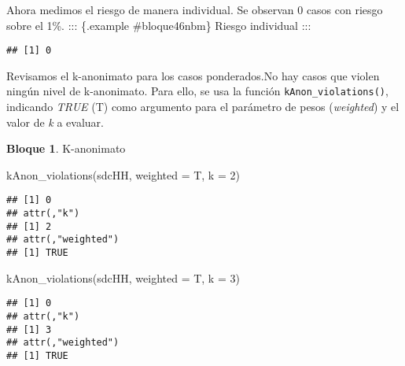 \documentclass[
]{book}
\newenvironment{Shaded}{\begin{snugshade}}{\end{snugshade}}
\newcommand{\AttributeTok}[1]{\textcolor[rgb]{0.77,0.63,0.00}{#1}}
\newcommand{\CommentTok}[1]{\textcolor[rgb]{0.56,0.35,0.01}{\textit{#1}}}
\newcommand{\DecValTok}[1]{\textcolor[rgb]{0.00,0.00,0.81}{#1}}
\newcommand{\FloatTok}[1]{\textcolor[rgb]{0.00,0.00,0.81}{#1}}
\newcommand{\FunctionTok}[1]{\textcolor[rgb]{0.00,0.00,0.00}{#1}}
\newcommand{\NormalTok}[1]{#1}
\newcommand{\SpecialCharTok}[1]{\textcolor[rgb]{0.00,0.00,0.00}{#1}}
\newcommand{\StringTok}[1]{\textcolor[rgb]{0.31,0.60,0.02}{#1}}
\theoremstyle{definition}
\theoremstyle{definition}
\newtheorem{example}{Bloque}[chapter]
\theoremstyle{definition}
\theoremstyle{definition}
\theoremstyle{remark}
\begin{document}
Ahora medimos el riesgo de manera individual. Se observan 0 casos con riesgo sobre el 1\%.
::: \{.example \#bloque46nbm\}
Riesgo individual
:::

\begin{Shaded}
\end{Shaded}

\begin{verbatim}
## [1] 0
\end{verbatim}

Revisamos el k-anonimato para los casos ponderados.No hay casos que violen ningún nivel de k-anonimato. Para ello, se usa la función \texttt{kAnon\_violations()}, indicando \emph{TRUE} (T) como argumento para el parámetro de pesos (\emph{weighted}) y el valor de \emph{k} a evaluar.

\begin{example}
\protect\hypertarget{exm:bloque47nbm}{}\label{exm:bloque47nbm}K-anonimato
\end{example}

\begin{Shaded}
\begin{Highlighting}[]
\FunctionTok{kAnon\_violations}\NormalTok{(sdcHH, }\AttributeTok{weighted =}\NormalTok{ T, }\AttributeTok{k =} \DecValTok{2}\NormalTok{)}
\end{Highlighting}
\end{Shaded}

\begin{verbatim}
## [1] 0
## attr(,"k")
## [1] 2
## attr(,"weighted")
## [1] TRUE
\end{verbatim}

\begin{Shaded}
\begin{Highlighting}[]
\FunctionTok{kAnon\_violations}\NormalTok{(sdcHH, }\AttributeTok{weighted =}\NormalTok{ T, }\AttributeTok{k =} \DecValTok{3}\NormalTok{)}
\end{Highlighting}
\end{Shaded}

\begin{verbatim}
## [1] 0
## attr(,"k")
## [1] 3
## attr(,"weighted")
## [1] TRUE
\end{verbatim}
\end{document}
